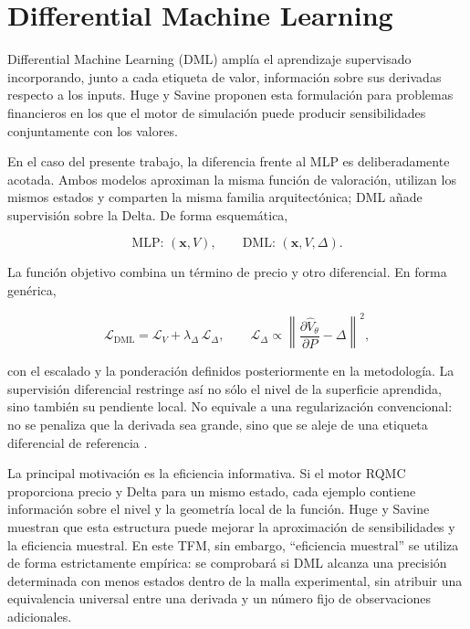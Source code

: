 \section{Differential Machine Learning}
\label{sec:dml_literature}

Differential Machine Learning (DML) amplía el aprendizaje supervisado incorporando,
junto a cada etiqueta de valor, información sobre sus derivadas respecto a los
inputs. Huge y Savine \parencite{huge_savine_2020} proponen esta formulación para
problemas financieros en los que el motor de simulación puede producir
sensibilidades conjuntamente con los valores.

En el caso del presente trabajo, la diferencia frente al MLP es deliberadamente
acotada. Ambos modelos aproximan la misma función de valoración, utilizan los mismos
estados y comparten la misma familia arquitectónica; DML añade supervisión sobre la
Delta. De forma esquemática,

\begin{equation}
    \text{MLP: }(\mathbf x,V),
    \qquad
    \text{DML: }(\mathbf x,V,\Delta).
\end{equation}

La función objetivo combina un término de precio y otro diferencial. En forma
genérica,

\begin{equation}
    \mathcal L_{\mathrm{DML}}
    =
    \mathcal L_V
    +
    \lambda_\Delta\,\mathcal L_\Delta,
    \qquad
    \mathcal L_\Delta
    \propto
    \left\|
        \frac{\partial \widehat V_\theta}{\partial P}
        -
        \Delta
    \right\|^2 ,
    \label{eq:dml_general_loss_literature}
\end{equation}

con el escalado y la ponderación definidos posteriormente en la metodología. La
supervisión diferencial restringe así no sólo el nivel de la superficie aprendida,
sino también su pendiente local. No equivale a una regularización convencional:
no se penaliza que la derivada sea grande, sino que se aleje de una etiqueta
diferencial de referencia \cite{huge_savine_2020}.

La principal motivación es la eficiencia informativa. Si el motor RQMC proporciona
precio y Delta para un mismo estado, cada ejemplo contiene información sobre el
nivel y la geometría local de la función. Huge y Savine
\parencite{huge_savine_2020} muestran que esta estructura puede mejorar la
aproximación de sensibilidades y la eficiencia muestral. En este TFM, sin embargo,
``eficiencia muestral'' se utiliza de forma estrictamente empírica: se comprobará si
DML alcanza una precisión determinada con menos estados dentro de la malla
experimental, sin atribuir una equivalencia universal entre una derivada y un número
fijo de observaciones adicionales.

